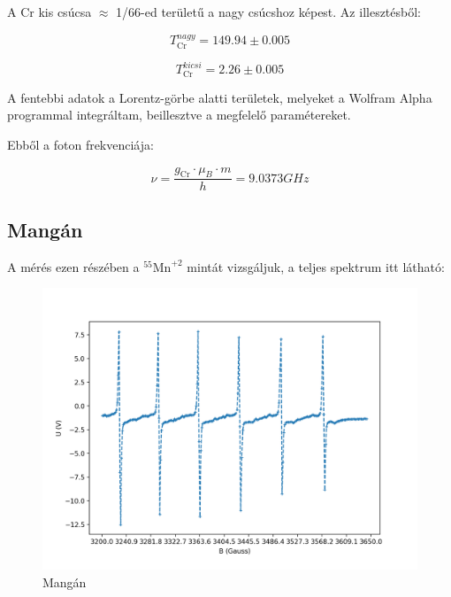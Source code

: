 \documentclass[12pt,a4paper]{article}
\theoremstyle{plain}
\begin{document}
\par A \textrm{Cr} kis csúcsa $\approx$ 1/66-ed
területű a nagy csúcshoz képest. Az illesztésből:

\begin{equation}
    T_{\textrm{Cr}}^{nagy}= 149.94 \pm 0.005
\end{equation}

\begin{equation}
    T_{\textrm{Cr}}^{kicsi}= 2.26 \pm 0.005
\end{equation}

\par A fentebbi adatok a Lorentz-görbe alatti területek,
melyeket a Wolfram Alpha programmal integráltam, 
beillesztve a megfelelő paramétereket.

\par Ebből a foton frekvenciája:

\begin{equation}
    \nu = \dfrac{g_{\textrm{Cr}}\cdot\mu_{B}\cdot m}{h} = 9.0373 GHz
\end{equation}

\subsection{Mangán}

\par A mérés ezen részében a $^{55}\textrm{Mn}^{+2}$
mintát vizsgáljuk, a teljes spektrum itt látható:

\begin{figure}[H]
    \centering
    \includegraphics[width=.9\linewidth]{./alex_manganese.png}
    \caption{Mangán}
\end{figure}
\end{document}
